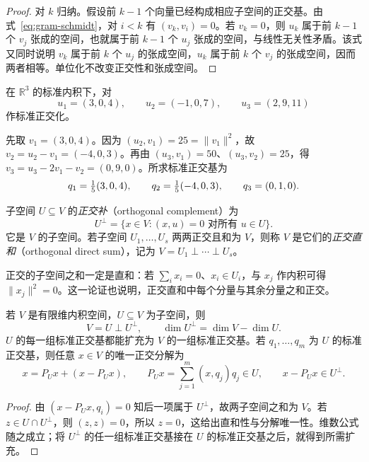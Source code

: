 \begin{proof}
对 $k$ 归纳。假设前 $k-1$ 个向量已经构成相应子空间的正交基。由式~\eqref{eq:gram-schmidt}，对 $i<k$ 有 $(v_k,v_i)=0$。若 $v_k=0$，则 $u_k$ 属于前 $k-1$ 个 $v_j$ 张成的空间，也就属于前 $k-1$ 个 $u_j$ 张成的空间，与线性无关性矛盾。该式又同时说明 $v_k$ 属于前 $k$ 个 $u_j$ 的张成空间，$u_k$ 属于前 $k$ 个 $v_j$ 的张成空间，因而两者相等。单位化不改变正交性和张成空间。
\end{proof}

\begin{example}
在 $\mathbb R^3$ 的标准内积下，对
\[
    u_1=(3,0,4),\qquad u_2=(-1,0,7),\qquad u_3=(2,9,11)
\]
作标准正交化。
\end{example}
\begin{solve}
先取 $v_1=(3,0,4)$。因为 $(u_2,v_1)=25=\|v_1\|^2$，故 $v_2=u_2-v_1=(-4,0,3)$。再由 $(u_3,v_1)=50$、$(u_3,v_2)=25$，得 $v_3=u_3-2v_1-v_2=(0,9,0)$。所求标准正交基为
\[
    q_1=\tfrac15(3,0,4),\qquad
    q_2=\tfrac15(-4,0,3),\qquad q_3=(0,1,0).\qedhere
\]
\end{solve}

\begin{definition}
子空间 $U\subseteq V$ 的\emph{正交补}（orthogonal complement）为
\[
    U^\perp=\{x\in V:(x,u)=0\text{ 对所有 }u\in U\}.
\]
它是 $V$ 的子空间。若子空间 $U_1,\ldots,U_s$ 两两正交且和为 $V$，则称 $V$ 是它们的\emph{正交直和}（orthogonal direct sum），记为 $V=U_1\mathbin\perp\cdots\mathbin\perp U_s$。
\end{definition}

正交的子空间之和一定是直和：若 $\sum_i x_i=0$、$x_i\in U_i$，与 $x_j$ 作内积可得 $\|x_j\|^2=0$。这一论证也说明，正交直和中每个分量与其余分量之和正交。

\begin{theorem}
\label{thm:orthogonal-decomposition}
若 $V$ 是有限维内积空间，$U\subseteq V$ 为子空间，则
\[
    V=U\mathbin\perp U^\perp,\qquad
    \dim U^\perp=\dim V-\dim U.
\]
$U$ 的每一组标准正交基都能扩充为 $V$ 的一组标准正交基。若 $q_1,\ldots,q_m$ 为 $U$ 的标准正交基，则任意 $x\in V$ 的唯一正交分解为
\begin{equation}
\label{eq:orthogonal-projection}
    x=P_Ux+(x-P_Ux),\qquad
    P_Ux=\sum_{j=1}^m(x,q_j)q_j\in U,\qquad x-P_Ux\in U^\perp.
\end{equation}
\end{theorem}

\begin{proof}
由 $(x-P_Ux,q_i)=0$ 知后一项属于 $U^\perp$，故两子空间之和为 $V$。若 $z\in U\cap U^\perp$，则 $(z,z)=0$，所以 $z=0$，这给出直和性与分解唯一性。维数公式随之成立；将 $U^\perp$ 的任一组标准正交基接在 $U$ 的标准正交基之后，就得到所需扩充。
\end{proof}

